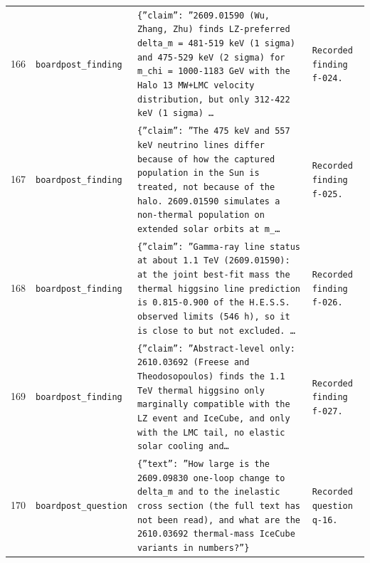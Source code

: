 \documentclass[11pt,a4paper]{article}
\begin{document}
\begin{longtable}{@{}p{}p{}p{}p{}@{}}
166 & \texttt{board}\newline\texttt{post\_\allowbreak{}finding} & \texttt{\{''claim'':\allowbreak{} ''2609.01590 (Wu,\allowbreak{} Zhang,\allowbreak{} Zhu)\allowbreak{} finds LZ-preferred delta\_\allowbreak{}m =\allowbreak{} 481-519 keV (1 sigma)\allowbreak{} and 475-529 keV (2 sigma)\allowbreak{} for m\_\allowbreak{}chi =\allowbreak{} 1000-1183 GeV with the Halo 13 MW+LMC velocity distribution,\allowbreak{} but only 312-422 keV (1 sigma)\allowbreak{} \ldots{}\allowbreak{}} & \texttt{Recorded finding f-024.} \\
167 & \texttt{board}\newline\texttt{post\_\allowbreak{}finding} & \texttt{\{''claim'':\allowbreak{} ''The 475 keV and 557 keV neutrino lines differ because of how the captured population in the Sun is treated,\allowbreak{} not because of the halo. 2609.01590 simulates a non-thermal population on extended solar orbits at m\_\allowbreak{}\ldots{}\allowbreak{}} & \texttt{Recorded finding f-025.} \\
168 & \texttt{board}\newline\texttt{post\_\allowbreak{}finding} & \texttt{\{''claim'':\allowbreak{} ''Gamma-ray line status at about 1.1 TeV (2609.01590)\allowbreak{}:\allowbreak{} at the joint best-fit mass the thermal higgsino line prediction is 0.815-0.900 of the H.E.S.S. observed limits (546 h)\allowbreak{},\allowbreak{} so it is close to but not excluded. \ldots{}\allowbreak{}} & \texttt{Recorded finding f-026.} \\
169 & \texttt{board}\newline\texttt{post\_\allowbreak{}finding} & \texttt{\{''claim'':\allowbreak{} ''Abstract-level only:\allowbreak{} 2610.03692 (Freese and Theodosopoulos)\allowbreak{} finds the 1.1 TeV thermal higgsino only marginally compatible with the LZ event and IceCube,\allowbreak{} and only with the LMC tail,\allowbreak{} no elastic solar cooling and\ldots{}\allowbreak{}} & \texttt{Recorded finding f-027.} \\
170 & \texttt{board}\newline\texttt{post\_\allowbreak{}question} & \texttt{\{''text'':\allowbreak{} ''How large is the 2609.09830 one-loop change to delta\_\allowbreak{}m and to the inelastic cross section (the full text has not been read)\allowbreak{},\allowbreak{} and what are the 2610.03692 thermal-mass IceCube variants in numbers?''\}\allowbreak{}} & \texttt{Recorded question q-16.} \\

\end{longtable}
\end{document}
